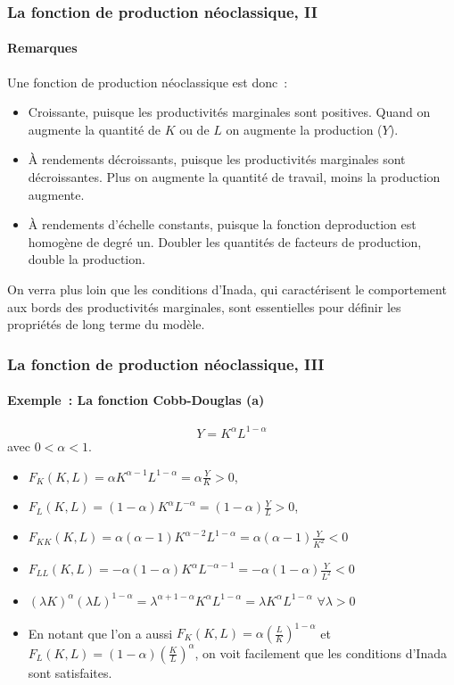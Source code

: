 \documentclass[10pt,notheorems]{beamer}
\theoremstyle{plain}
\theoremstyle{definition} %
\begin{document}
\begin{frame}
  \frametitle{La fonction de production néoclassique, II}
  \framesubtitle{Remarques}

  Une fonction de production néoclassique est donc~:

  \medskip

  \begin{itemize}

  \item Croissante, puisque les productivités marginales sont positives. Quand on augmente la quantité de $K$ ou de $L$ on augmente la production ($Y$).\newline

  \item À rendements décroissants, puisque les productivités marginales sont décroissantes. Plus on augmente la quantité de travail, moins la production augmente.\newline

  \item À rendements d'échelle constants, puisque la fonction deproduction est homogène de degré un. Doubler les quantités de facteurs de production, double la production.\newline

  \end{itemize}

  On verra plus loin que les conditions d'Inada, qui caractérisent le comportement aux bords des productivités marginales, sont essentielles pour définir les propriétés de long terme du modèle.\newline
\end{frame}

\begin{frame}
  \frametitle{La fonction de production néoclassique, III}
  \framesubtitle{Exemple~: La fonction Cobb-Douglas (a)}


  \[
    Y = K^{\alpha}L ^{1-\alpha}
  \]
  avec $0<\alpha<1$.

  \bigskip

  \begin{itemize}

  \item $F_K(K,L) = \alpha K^{\alpha-1}L^{1-\alpha}=\alpha\frac{Y}{K}>0$,
  \item $F_L(K,L) = (1-\alpha) K^{\alpha}L^{-\alpha}=(1-\alpha)\frac{Y}{L}>0$,
  \item $F_{KK}(K,L) = \alpha(\alpha-1)K^{\alpha-2}L^{1-\alpha}=\alpha(\alpha-1)\frac{Y}{K^2}<0$
  \item $F_{LL}(K,L) = -\alpha(1-\alpha)K^{\alpha}L^{-\alpha-1}=-\alpha(1-\alpha)\frac{Y}{L^2}<0$
  \item $\left(\lambda K\right)^{\alpha}\left(\lambda L\right)^{1-\alpha}=\lambda^{\alpha+1-\alpha}K^{\alpha}L ^{1-\alpha} = \lambda K^{\alpha}L ^{1-\alpha}$ $\forall \lambda>0$
  \item En notant que l'on a aussi $F_K(K,L) = \alpha \left(\frac{L}{K}\right)^{1-\alpha}$ et $F_L(K,L) = (1-\alpha) \left(\frac{K}{L}\right)^{\alpha}$, on voit facilement que les conditions d'Inada sont satisfaites.
  \end{itemize}

\end{frame}
\end{document}
